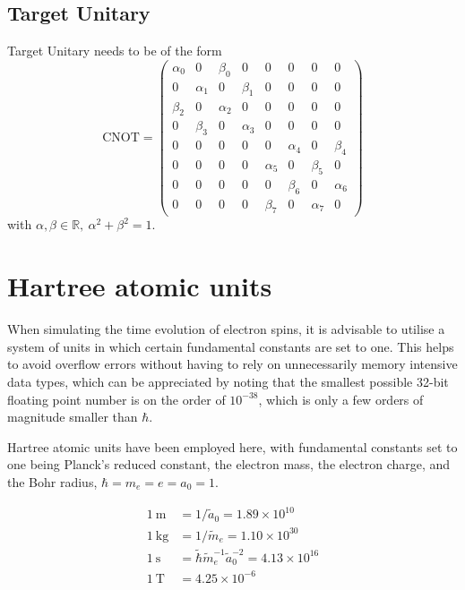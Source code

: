 \documentclass[12pt]{article}
\begin{document}
\subsection{Target Unitary}
Target Unitary needs to be of the form
\begin{equation}
    \text{CNOT} = \begin{pmatrix}
    \alpha_0 &0 &\beta_0 &0 &0 &0 &0 &0 \\
     0&\alpha_1 &0 &\beta_1 &0 &0 &0  &0\\
     \beta_2 &0 &\alpha_2 &0 &0 &0 &0 &0\\
      0 &\beta_3 &0 &\alpha_3 &0 &0 &0 &0 \\
      0&0&0 &0 &0 &\alpha_4 &0 &\beta_4 \\
      0&0&0 &0 &\alpha_5 &0 &\beta_5 &0 \\
      0&0 &0 &0 &0 &\beta_6 &0 &\alpha_6\\
      0&0&0 &0 &\beta_7 &0 &\alpha_7 &0  
      \end{pmatrix}
\end{equation}
with $\alpha,\beta\in\mathbb{R},\ \alpha^2+\beta^2 = 1$.
    
\section{Hartree atomic units}
When simulating the time evolution of electron spins, it is advisable to utilise a system of units in which certain fundamental constants are set to one. This helps to avoid overflow errors without having to rely on unnecessarily memory intensive data types, which can be appreciated by noting that the smallest possible 32-bit floating point number is on the order of $10^{-38}$, which is only a few orders of magnitude smaller than $\hbar$.

Hartree atomic units have been employed here, with fundamental constants set to one being Planck's reduced constant, the electron mass, the electron charge, and the Bohr radius, $\hbar=m_e=e=a_0=1$.

\begin{align}
    1\ \unit{\metre} &= 1/\tilde a_0 = 1.89\times 10^{10}\\
    1\ \unit{\kg} &= 1/\tilde m_e = 1.10\times 10^{30}\\
    1\ \unit{\second}&= \tilde\hbar \tilde m_e^{-1}\tilde a_0^{-2} =4.13\times 10^{16}\\
    1\ \unit{\tesla} &= 4.25\times 10^{-6} \\
\end{align}
\end{document}
